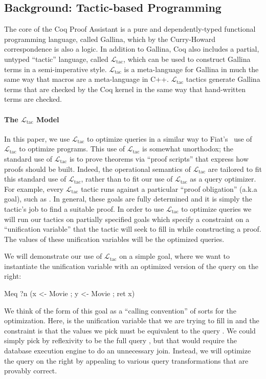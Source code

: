 \documentclass[preprint]{sigplanconf}
\newcommand{\ltac}[0]{\ensuremath{\mathcal{L}_{\mathrm{tac}}}}
\begin{document}

\subsection{Background: Tactic-based Programming}
\label{sec:tactic-based}

The core of the Coq Proof Assistant is a pure and dependently-typed functional programming language, called Gallina, which by the Curry-Howard correspondence is also a logic.
In addition to Gallina, Coq also includes a partial, untyped ``tactic'' language, called \ltac{}, which can be used to construct Gallina terms in a semi-imperative style. 
\ltac{} is a meta-language for Gallina in much the same way that macros are a meta-language in C++.
\ltac{} tactics generate Gallina terms that are checked by the Coq kernel in the same way that hand-written terms are checked.

\paragraph{The \ltac{} Model}
In this paper, we use \ltac{} to optimize queries in a similar way to Fiat's~\cite{} use of \ltac{} to optimize programs.
This use of \ltac{} is somewhat unorthodox; the standard use of \ltac{} is to prove theorems via ``proof scripts'' that express how proofs should be built.
Indeed, the operational semantics of \ltac{} are tailored to fit this standard use of \ltac{}, rather than to fit our use of \ltac{} as a query optimizer.
For example, every \ltac{} tactic runs against a particular ``proof obligation'' (a.k.a goal), such as .
In general, these goals are fully determined and it is simply the tactic's job to find a suitable proof.
In order to use \ltac{} to optimize queries we will run our tactics on partially specified goals which specify a constraint on a ``unification variable'' that the tactic will seek to fill in while constructing a proof.
The values of these unification variables will be the optimized queries.

We will demonstrate our use of \ltac{} on a simple goal, where we want to instantiate the unification variable  with an optimized version of the query on the right:
\begin{coq}
Meq ?n (x <- Movie ; y <- Movie ; ret x)
\end{coq}
We think of the form of this goal as a ``calling convention'' of sorts for the optimization.
Here,  is the unification variable that we are trying to fill in and the constraint is that the values we pick must be equivalent to the query .
We could simply pick  by reflexivity to be the full query , but that would require the database execution engine to do an unnecessary join.
Instead, we will optimize the query on the right by appealing to various query transformations that are provably correct.
\end{document}
